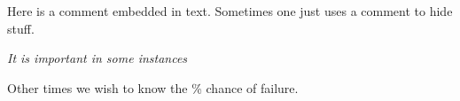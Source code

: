 \documentclass{article}
\begin{document}
Here %
is a comment embedded in text.
Sometimes one just uses
a comment to hide stuff.

{\it It is important %
in some instances}

Other times we wish to know the \% chance of failure.
\end{document}
